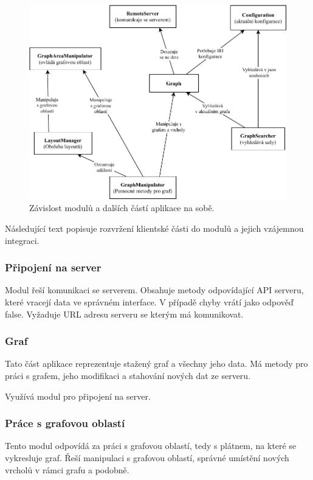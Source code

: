 \begin{figure}
    \centering
    \includegraphics[width=\textwidth]{media/dependencies.pdf}
    \caption{Závislost modulů a dalších částí aplikace na sobě. }
\end{figure}

Následující text popisuje rozvržení klientské části do modulů a jejich vzájemnou integraci.

\subsubsection{Připojení na server}
Modul řeší komunikaci se serverem. Obsahuje metody odpovídající API serveru, které vracejí data ve správném interface. V případě chyby vrátí jako odpověď false. Vyžaduje URL adresu serveru se kterým má komunikovat.

\subsubsection{Graf}
Tato část aplikace reprezentuje stažený graf a všechny jeho data. Má metody pro práci s grafem, jeho modifikaci a stahování nových dat ze serveru.

Využívá modul pro připojení na server.

\subsubsection{Práce s grafovou oblastí}
Tento modul odpovídá za práci s grafovou oblastí, tedy s plátnem, na které se vykresluje graf. Řeší manipulaci s grafovou oblastí, správné umístění nových vrcholů v rámci grafu a podobně.

